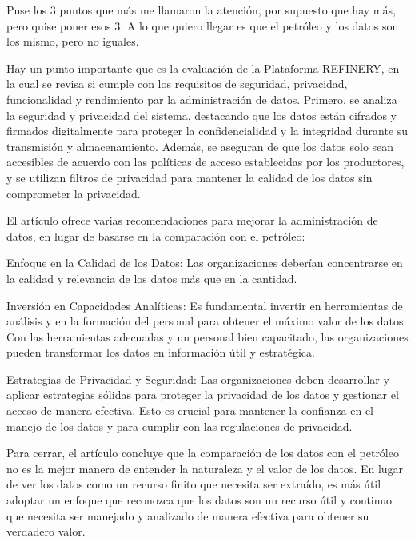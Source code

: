 Puse los 3 puntos que más me llamaron la atención, por supuesto que hay más, pero quise poner esos 3. A lo que quiero llegar es que el petróleo y los datos son los mismo, pero no iguales.

Hay un punto importante que es la evaluación de la Plataforma REFINERY, en la cual se revisa si cumple con los requisitos de seguridad, privacidad, funcionalidad y rendimiento par la administración de datos. Primero, se analiza la seguridad y privacidad del sistema, destacando que los datos están cifrados y firmados digitalmente para proteger la confidencialidad y la integridad durante su transmisión y almacenamiento. Además, se aseguran de que los datos solo sean accesibles de acuerdo con las políticas de acceso establecidas por los productores, y se utilizan filtros de privacidad para mantener la calidad de los datos sin comprometer la privacidad.


El artículo ofrece varias recomendaciones para mejorar la administración de datos, en lugar de basarse en la comparación con el petróleo:

Enfoque en la Calidad de los Datos: Las organizaciones deberían concentrarse en la calidad y relevancia de los datos más que en la cantidad. 

Inversión en Capacidades Analíticas: Es fundamental invertir en herramientas de análisis y en la formación del personal para obtener el máximo valor de los datos. Con las herramientas adecuadas y un personal bien capacitado, las organizaciones pueden transformar los datos en información útil y estratégica.

Estrategias de Privacidad y Seguridad: Las organizaciones deben desarrollar y aplicar estrategias sólidas para proteger la privacidad de los datos y gestionar el acceso de manera efectiva. Esto es crucial para mantener la confianza en el manejo de los datos y para cumplir con las regulaciones de privacidad.

Para cerrar, el artículo concluye que la comparación de los datos con el petróleo no es la mejor manera de entender la naturaleza y el valor de los datos. En lugar de ver los datos como un recurso finito que necesita ser extraído, es más útil adoptar un enfoque que reconozca que los datos son un recurso útil y continuo que necesita ser manejado y analizado de manera efectiva para obtener su verdadero valor.